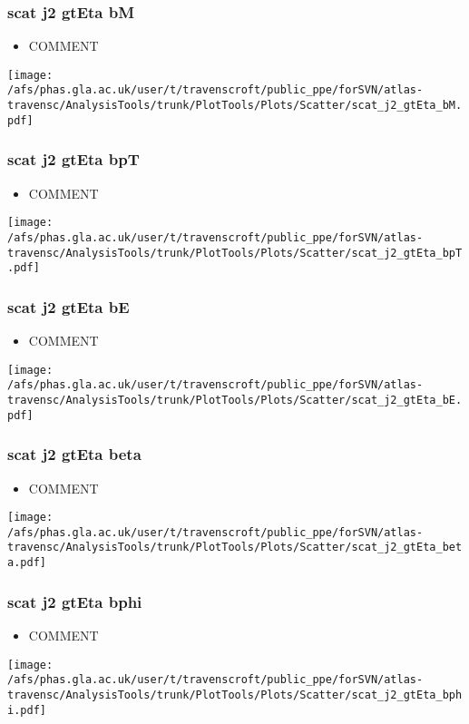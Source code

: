 \documentclass{beamer}
\begin{document}
\begin{frame}
\frametitle{scat j2 gtEta bM}
\begin{itemize}
\item COMMENT
\end{itemize}
\begin{center}
\texttt{[image: /afs/phas.gla.ac.uk/user/t/travenscroft/public\_ppe/forSVN/atlas-travensc/AnalysisTools/trunk/PlotTools/Plots/Scatter/scat\_j2\_gtEta\_bM.pdf]}
\end{center}
\end{frame}

\begin{frame}
\frametitle{scat j2 gtEta bpT}
\begin{itemize}
\item COMMENT
\end{itemize}
\begin{center}
\texttt{[image: /afs/phas.gla.ac.uk/user/t/travenscroft/public\_ppe/forSVN/atlas-travensc/AnalysisTools/trunk/PlotTools/Plots/Scatter/scat\_j2\_gtEta\_bpT.pdf]}
\end{center}
\end{frame}

\begin{frame}
\frametitle{scat j2 gtEta bE}
\begin{itemize}
\item COMMENT
\end{itemize}
\begin{center}
\texttt{[image: /afs/phas.gla.ac.uk/user/t/travenscroft/public\_ppe/forSVN/atlas-travensc/AnalysisTools/trunk/PlotTools/Plots/Scatter/scat\_j2\_gtEta\_bE.pdf]}
\end{center}
\end{frame}

\begin{frame}
\frametitle{scat j2 gtEta beta}
\begin{itemize}
\item COMMENT
\end{itemize}
\begin{center}
\texttt{[image: /afs/phas.gla.ac.uk/user/t/travenscroft/public\_ppe/forSVN/atlas-travensc/AnalysisTools/trunk/PlotTools/Plots/Scatter/scat\_j2\_gtEta\_beta.pdf]}
\end{center}
\end{frame}

\begin{frame}
\frametitle{scat j2 gtEta bphi}
\begin{itemize}
\item COMMENT
\end{itemize}
\begin{center}
\texttt{[image: /afs/phas.gla.ac.uk/user/t/travenscroft/public\_ppe/forSVN/atlas-travensc/AnalysisTools/trunk/PlotTools/Plots/Scatter/scat\_j2\_gtEta\_bphi.pdf]}
\end{center}
\end{frame}
\end{document}
